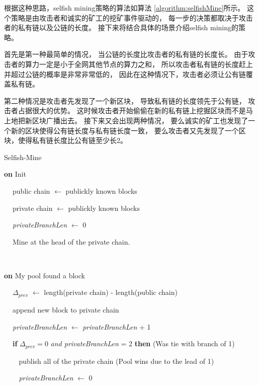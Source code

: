 \documentclass[a4paper, 11pt]{article}
\begin{document}
\begin{CJK*}{UTF8}{gbsn}
    根据这种思路，selfish mining策略的算法如算法 \ref{algorithm:selfishMine}所示。
    这个策略是由攻击者和诚实的矿工的挖矿事件驱动的，
    每一步的决策都取决于攻击者的私有链以及公链的长度。
    接下来将结合具体的场景介绍selfish mining的策略。

    首先是第一种最简单的情况，
    当公链的长度比攻击者的私有链的长度长。
    由于攻击者的算力一定是小于全网其他节点的算力之和，
    所以攻击者私有链的长度赶上并超过公链的概率是非常非常低的，
    因此在这种情况下，攻击者必须让公有链覆盖私有链。

    第二种情况是攻击者先发现了一个新区块，
    导致私有链的长度领先于公有链，
    攻击者占据很大的优势。
    这时候攻击者开始偷偷在新的私有链上挖掘区块而不是马上地把新区块广播出去。
    接下来又会出现两种情况，
    要么诚实的矿工也发现了一个新的区块使得公有链长度与私有链长度一致，
    要么攻击者又先发现了一个区块，使得私有链长度比公有链至少长2。

    \begin{algorithm}
        \caption{Selfish-Mine}
        \label{algorithm:selfishMine}

        \textbf{on} Init

            $\ \ \ \ $ public chain  $\leftarrow$ publickly known blocks

            $\ \ \ \ $ private chain $\leftarrow$ publickly known blocks

            $\ \ \ \ $ \textit{privateBranchLen} $\leftarrow$ 0

            $\ \ \ \ $ Mine at the head of the private chain.

        $ $
        
        \textbf{on} My pool found a block

            $\ \ \ \ $ $\Delta_{\textit{prev}}$ $\leftarrow$ length(private chain) - length(public chain)

            $\ \ \ \ $ append new block to private chain

            $\ \ \ \ $ \textit{privateBranchLen} $\leftarrow$ \textit{privateBranchLen} + 1

            $\ \ \ \ $ \textbf{if} $\Delta_{\textit{prev}} = 0$ \textit{and privateBranchLen} = 2 \textbf{then} \hfill (Was tie with branch of 1)

                $\ \ \ \ \ \ \ \ $ publish all of the private chain \hfill (Pool wins due to the lead of 1)

                $\ \ \ \ \ \ \ \ $ \textit{privateBranchLen} $\leftarrow$ 0
            

\end{algorithm}
\end{CJK*}
\end{document}
